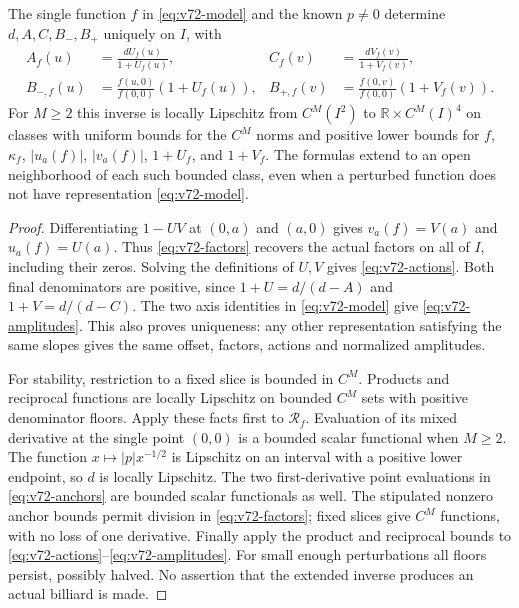 \begin{theorem}
\label{thm:v72-separation}
The single function $f$ in \eqref{eq:v72-model} and the known $p\ne0$
determine $d,A,C,B_-,B_+$ uniquely on $I$, with
\begin{align}
 A_f(u)&=\frac{dU_f(u)}{1+U_f(u)},&
 C_f(v)&=\frac{dV_f(v)}{1+V_f(v)},\label{eq:v72-actions}\\
 B_{-,f}(u)&=\frac{f(u,0)}{f(0,0)}(1+U_f(u)),&
 B_{+,f}(v)&=\frac{f(0,v)}{f(0,0)}(1+V_f(v)).
                         \label{eq:v72-amplitudes}
\end{align}
For $M\ge2$ this inverse is locally Lipschitz from $C^M(I^2)$ to
$\mathbb R\times C^M(I)^4$ on classes with uniform bounds for the
$C^M$ norms and positive lower bounds for $f$, $\kappa_f$,
$|u_a(f)|$, $|v_a(f)|$, $1+U_f$, and $1+V_f$.  The formulas extend to
an open neighborhood of each such bounded class, even when a perturbed
function does not have representation \eqref{eq:v72-model}.
\end{theorem}
\begin{proof}
Differentiating $1-UV$ at $(0,a)$ and $(a,0)$ gives
$v_a(f)=V(a)$ and $u_a(f)=U(a)$.  Thus \eqref{eq:v72-factors} recovers
the actual factors on all of $I$, including their zeros.  Solving the
definitions of $U,V$ gives \eqref{eq:v72-actions}.  Both final
denominators are positive, since $1+U=d/(d-A)$ and
$1+V=d/(d-C)$.  The two axis identities in \eqref{eq:v72-model} give
\eqref{eq:v72-amplitudes}.  This also proves uniqueness: any other
representation satisfying the same slopes gives the same offset,
factors, actions and normalized amplitudes.

For stability, restriction to a fixed slice is bounded in $C^M$.
Products and reciprocal functions are locally Lipschitz on bounded
$C^M$ sets with positive denominator floors.  Apply these facts first to
$\mathcal R_f$.  Evaluation of its mixed derivative at the single point
$(0,0)$ is a bounded scalar functional when $M\ge2$.  The function
$x\mapsto |p|x^{-1/2}$ is Lipschitz on an interval with a positive lower
endpoint, so $d$ is locally Lipschitz.  The two first-derivative point
evaluations in \eqref{eq:v72-anchors} are bounded scalar functionals as
well.  The stipulated nonzero anchor bounds permit division in
\eqref{eq:v72-factors}; fixed slices give $C^M$ functions, with no loss
of one derivative.  Finally apply the product and reciprocal bounds to
\eqref{eq:v72-actions}--\eqref{eq:v72-amplitudes}.  For small enough
perturbations all floors persist, possibly halved.  No assertion that the
extended inverse produces an actual billiard is made.
\end{proof}

